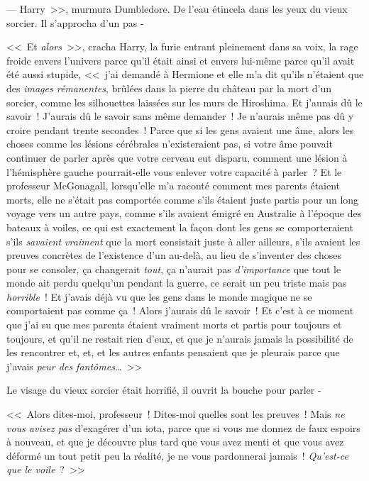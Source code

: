 --- Harry~>>, murmura Dumbledore. De l'eau étincela dans les yeux du vieux sorcier. Il s'approcha d'un pas -

<<~Et \emph{alors}~>>, cracha Harry, la furie entrant pleinement dans sa voix, la rage froide envers l'univers parce qu'il était ainsi et envers lui-même parce qu'il avait été aussi stupide, <<~j'ai demandé à Hermione et elle m'a dit qu'ils n'étaient que des \emph{images rémanentes}, brûlées dans la pierre du château par la mort d'un sorcier, comme les silhouettes laissées sur les murs de Hiroshima. Et j'aurais dû le savoir~! J'aurais dû le savoir sans même demander~! Je n'aurais même pas dû y croire pendant trente secondes~! Parce que si les gens avaient une âme, alors les choses comme les lésions cérébrales n'existeraient pas, si votre âme pouvait continuer de parler après que votre cerveau eut disparu, comment une lésion à l'hémisphère gauche pourrait-elle vous enlever votre capacité à parler~? Et le professeur McGonagall, lorsqu'elle m'a raconté comment mes parents étaient morts, elle ne s'était pas comportée comme s'ils étaient juste partis pour un long voyage vers un autre pays, comme s'ils avaient émigré en Australie à l'époque des bateaux à voiles, ce qui est exactement la façon dont les gens se comporteraient s'ils \emph{savaient vraiment} que la mort consistait juste à aller ailleurs, s'ils avaient les preuves concrètes de l'existence d'un au-delà, au lieu de s'inventer des choses pour se consoler, ça changerait \emph{tout}, ça n'aurait pas \emph{d'importance} que tout le monde ait perdu quelqu'un pendant la guerre, ce serait un peu triste mais pas \emph{horrible}~! Et j'avais déjà vu que les gens dans le monde magique ne se comportaient pas comme ça~! Alors j'aurais dû le savoir~! Et c'est à ce moment que j'ai su que mes parents étaient vraiment morts et partis pour toujours et toujours, et qu'il ne restait rien d'eux, et que je n'aurais jamais la possibilité de les rencontrer et, et, et les autres enfants pensaient que je pleurais parce que j'avais \emph{peur des fantômes…}~>>

Le visage du vieux sorcier était horrifié, il ouvrit la bouche pour parler -

<<~Alors dites-moi, professeur~! Dites-moi quelles sont les preuves~! Mais \emph{ne vous avisez pas} d'exagérer d'un iota, parce que si vous me donnez de faux espoirs à nouveau, et que je découvre plus tard que vous avez menti et que vous avez déformé un tout petit peu la réalité, je ne vous pardonnerai jamais~! \emph{Qu'est-ce que le voile}~?~>>

